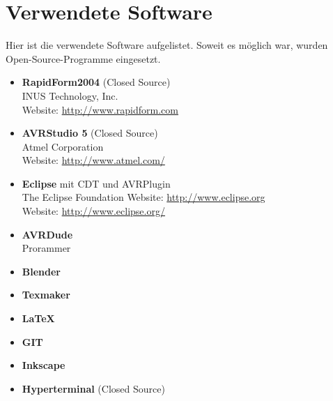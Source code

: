\section{Verwendete Software}
\label{sec:V_Software}
Hier ist die verwendete Software aufgelistet. Soweit es möglich war, wurden Open-Source-Programme eingesetzt.
\begin{itemize}
\item \textbf{RapidForm2004} (Closed Source)\\
INUS Technology, Inc.\\
Website: \url{http://www.rapidform.com}
\item \textbf{AVRStudio 5}  (Closed Source)\\
Atmel Corporation \\
Website: \url{http://www.atmel.com/}  
\item \textbf{Eclipse} mit CDT und AVRPlugin\\
The Eclipse Foundation
Website: \url{http://www.eclipse.org}
\\
Website: \url{http://www.eclipse.org/}  
\item \textbf{AVRDude} \\
Prorammer \\
\item \textbf{Blender}\\
\item \textbf{Texmaker}\\
\item \textbf{LaTeX}\\
\item \textbf{GIT}\\
\item \textbf{Inkscape}\\

\item \textbf{Hyperterminal} (Closed Source)\\

\end{itemize}

\\
